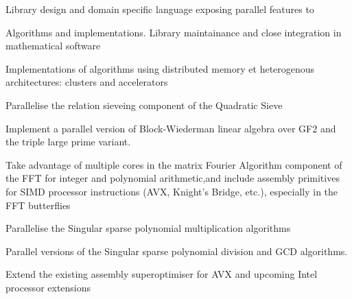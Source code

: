 \begin{workpackage}[id=hpc,wphases=36-48,
  title=High Performance Computing,
  PSRM=1, %
  LLRM=12, %
  SARM=1, %
  UKRM=1, %
  UBRM=1, %
  UJFRM=12]
\begin{wpdelivs}
  \begin{wpdeliv}[due=12,id=LinBox_DSL,dissem=??,nature=??]
    {Library design and domain specific language exposing \Linbox parallel features to \Sage}
  \end{wpdeliv}
  \begin{wpdeliv}[due=24,id=LinBox_algo,dissem=??,nature=??]
    {Algorithms and implementations. Library maintainance and close integration
      in mathematical software}
  \end{wpdeliv}
  \begin{wpdeliv}[due=36,id=LinBox_distributed,dissem=??,nature=??]
    {Implementations of algorithms using distributed memory et heterogenous
      architectures: clusters and accelerators}
  \end{wpdeliv}
  \begin{wpdeliv}[due=3,id=QS_sieving,dissem=??,nature=??]
      {Parallelise the relation sieveing component of the Quadratic Sieve}
\end{wpdeliv}
  \begin{wpdeliv}[due=9,id=QS_linalg,dissem=??,nature=??]
      {Implement a parallel version of Block-Wiederman linear algebra over GF2 and the triple large prime variant.}
\end{wpdeliv}
  \begin{wpdeliv}[due=12,id=FFT,dissem=??,nature=??]
    {Take advantage of multiple cores in the matrix Fourier Algorithm component of the FFT
      for integer and polynomial arithmetic,and include assembly primitives for SIMD
      processor instructions (AVX, Knight's Bridge, etc.), especially in the FFT
      butterflies}
\end{wpdeliv}
  \begin{wpdeliv}[due=12,id=singular_polymul,dissem=??,nature=??]
      {Parallelise the Singular sparse polynomial multiplication algorithms}
\end{wpdeliv}
  \begin{wpdeliv}[due=12,id=singular_polyarith,dissem=??,nature=??]
      {Parallel versions of the Singular sparse polynomial division and GCD algorithms.}
\end{wpdeliv}
  \begin{wpdeliv}[due=12,id=MPIRsuperoptimiser,dissem=??,nature=??]
      {Extend the existing assembly superoptimiser for AVX and upcoming Intel processor extensions}
\end{wpdeliv}
  \begin{wpdeliv}[due=24,id=MPIRprocessors,dissem=??,nature=??]

\end{wpdeliv}
\end{wpdelivs}
\end{workpackage}

